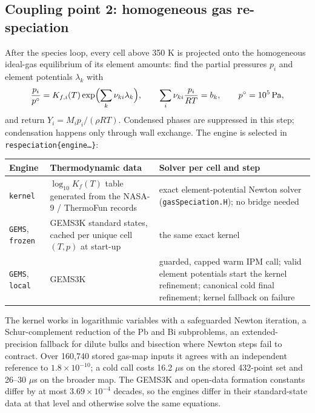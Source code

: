 \documentclass[11pt,a4paper]{article}
\newcommand{\units}[1]{\,\mathrm{#1}}
\begin{document}
\subsection{Coupling point 2: homogeneous gas re-speciation}

After the species loop, every cell above 350 K is projected onto the
homogeneous ideal-gas equilibrium of its element amounts: find the
partial pressures $p_i$ and element potentials $\lambda_k$ with
\begin{equation}
 \frac{p_i}{p^\circ}=K_{f,i}(T)\exp\Bigl(\sum_k\nu_{ki}\lambda_k\Bigr),
 \qquad \sum_i\nu_{ki}\frac{p_i}{RT}=b_k,
 \qquad p^\circ=10^5\units{Pa},
 \label{eq:equilibrium}
\end{equation}
and return $Y_i=M_ip_i/(\rho RT)$. Condensed phases are suppressed in
this step; condensation happens only through wall exchange. The
engine is selected in \texttt{respeciation\{engine\ldots\}}:
\begin{center}
\small
\begin{tabularx}{\textwidth}{@{}l X X@{}}
\toprule
Engine & Thermodynamic data & Solver per cell and step\\
\midrule
\texttt{kernel} & $\log_{10}K_f(T)$ table generated from the NASA-9 /
  ThermoFun records & exact element-potential Newton solver
  (\texttt{gasSpeciation.H}); no bridge needed\\
\texttt{GEMS}, \texttt{frozen} & GEMS3K standard states, cached per
  unique cell $(T,p)$ at start-up & the same exact kernel\\
\texttt{GEMS}, \texttt{local} & GEMS3K & guarded, capped warm IPM call;
  valid element potentials start the kernel refinement; canonical cold
  final refinement; kernel fallback on failure\\
\bottomrule
\end{tabularx}
\end{center}
The kernel works in logarithmic variables with a safeguarded Newton
iteration, a Schur-complement reduction of the Pb and Bi subproblems,
an extended-precision fallback for dilute bulks and bisection where
Newton steps fail to contract. Over 160,740 stored gas-map inputs it
agrees with an independent reference to $1.8\times10^{-10}$; a cold call
costs 16.2 $\mu$s on the stored 432-point set and 26--30 $\mu$s on the
broader map. The GEMS3K and open-data formation constants differ by at
most $3.69\times10^{-4}$ decades, so the engines differ in their
standard-state data at that level and otherwise solve the same
equations.
\end{document}
